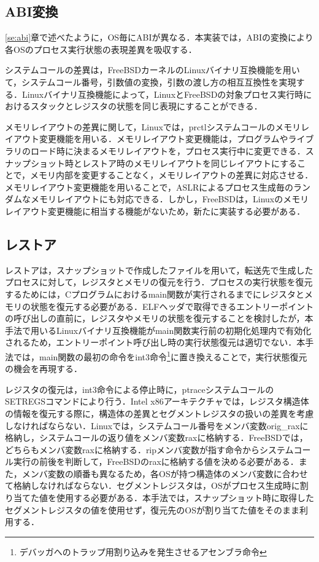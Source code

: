 \documentclass{ipsjpapers}
\begin{document}
\subsection{ABI変換}
\label{se:conv}
\ref{se:abi}章で述べたように，OS毎にABIが異なる．本実装では，ABIの変換により各OSのプロセス実行状態の表現差異を吸収する．

システムコールの差異は，FreeBSDカーネルのLinuxバイナリ互換機能\cite{linux-emu}を用いて，システムコール番号，引数値の変換，引数の渡し方の相互互換性を実現する．Linuxバイナリ互換機能によって，LinuxとFreeBSDの対象プロセス実行時におけるスタックとレジスタの状態を同じ表現にすることができる．

メモリレイアウトの差異に関して，Linuxでは，prctlシステムコールのメモリレイアウト変更機能を用いる．メモリレイアウト変更機能は，プログラムやライブラリのロード時に決まるメモリレイアウトを，プロセス実行中に変更できる．スナップショット時とレストア時のメモリレイアウトを同じレイアウトにすることで，メモリ内部を変更することなく，メモリレイアウトの差異に対応させる．メモリレイアウト変更機能を用いることで，ASLRによるプロセス生成毎のランダムなメモリレイアウトにも対応できる．しかし，FreeBSDは，Linuxのメモリレイアウト変更機能に相当する機能がないため，新たに実装する必要がある．

\subsection{レストア}
レストアは，スナップショットで作成したファイルを用いて，転送先で生成したプロセスに対して，レジスタとメモリの復元を行う．プロセスの実行状態を復元するためには，Cプログラムにおけるmain関数が実行されるまでにレジスタとメモリの状態を復元する必要がある．ELFヘッダで取得できるエントリーポイントの呼び出しの直前に，レジスタやメモリの状態を復元することを検討したが，本手法で用いるLinuxバイナリ互換機能がmain関数実行前の初期化処理内で有効化されるため，エントリーポイント呼び出し時の実行状態復元は適切でない．本手法では，main関数の最初の命令をint3命令\footnote{デバッガへのトラップ用割り込みを発生させるアセンブラ命令}に置き換えることで，実行状態復元の機会を再現する．

レジスタの復元は，int3命令による停止時に，ptraceシステムコールのSETREGSコマンドにより行う．Intel x86アーキテクチャでは，レジスタ構造体の情報を復元する際に，構造体の差異とセグメントレジスタの扱いの差異を考慮しなければならない．Linuxでは，システムコール番号をメンバ変数orig\_raxに格納し，システムコールの返り値をメンバ変数raxに格納する．FreeBSDでは，どちらもメンバ変数raxに格納する．ripメンバ変数が指す命令からシステムコール実行の前後を判断して，FreeBSDのraxに格納する値を決める必要がある．また，メンバ変数の順番も異なるため，各OSが持つ構造体のメンバ変数に合わせて格納しなければならない．セグメントレジスタは，OSがプロセス生成時に割り当てた値を使用する必要がある．本手法では，スナップショット時に取得したセグメントレジスタの値を使用せず，復元先のOSが割り当てた値をそのまま利用する．
\end{document}

